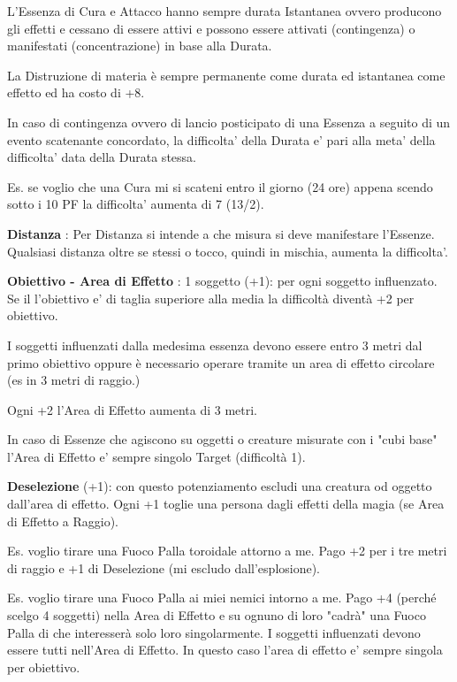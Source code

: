 \documentclass[a4paper,11pt,twoside,openany]{book}
\begin{document}
L'Essenza di Cura e Attacco hanno sempre durata Istantanea ovvero producono gli effetti e cessano di essere attivi e possono essere attivati (contingenza) o manifestati (concentrazione) in base alla Durata.

La Distruzione di materia è sempre permanente come durata ed istantanea come effetto ed ha costo di +8.

In caso di contingenza ovvero di lancio posticipato di una Essenza a seguito di un evento scatenante concordato, la difficolta' della Durata e' pari alla meta' della difficolta' data della Durata stessa.

Es. se voglio che una Cura mi si scateni entro il giorno (24 ore) appena scendo sotto i 10 PF la difficolta' aumenta di 7 (13/2).


\textbf{Distanza} : Per Distanza si intende a che misura si deve manifestare l'Essenze.
Qualsiasi distanza oltre se stessi o tocco, quindi in mischia, aumenta la difficolta'.


\textbf{Obiettivo - Area di Effetto} : 1 soggetto (+1): per ogni soggetto influenzato. Se il l'obiettivo e' di taglia superiore alla media la difficoltà diventà +2 per obiettivo.

I soggetti influenzati dalla medesima essenza devono essere entro 3 metri dal primo obiettivo oppure è necessario operare tramite un area di effetto circolare (es in 3 metri di raggio.)

Ogni +2 l'Area di Effetto aumenta di 3 metri.

In caso di Essenze che agiscono su oggetti o creature misurate con i "cubi base" l'Area di Effetto e' sempre singolo Target (difficoltà 1).


\textbf{Deselezione} (+1): con questo potenziamento escludi una creatura od oggetto dall'area di  effetto. Ogni +1 toglie una persona dagli effetti della magia (se Area di Effetto a Raggio).

Es. voglio tirare una Fuoco Palla toroidale attorno a me. Pago +2 per i tre metri di raggio e +1 di Deselezione (mi escludo dall'esplosione).

Es. voglio tirare una Fuoco Palla ai miei nemici intorno a me. Pago +4 (perché scelgo 4 soggetti) nella Area di Effetto e su ognuno di loro "cadrà" una Fuoco Palla di che interesserà solo loro singolarmente. I soggetti influenzati devono essere tutti nell'Area di Effetto. In questo caso l'area di effetto e' sempre singola per obiettivo.
\end{document}
